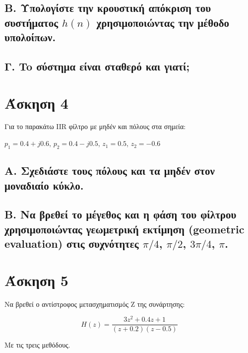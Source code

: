 \documentclass[12pt]{turabian-researchpaper}
\begin{document}
\subsection{Β. Υπολογίστε την κρουστική απόκριση του συστήματος \texorpdfstring{$h(n)$}{} χρησιμοποιώντας  την μέθοδο υπολοίπων.}
\subsection{Γ. To σύστημα είναι σταθερό και γιατί;}

\newpage\section{Άσκηση 4}

Για το παρακάτω IIR φίλτρο με μηδέν και πόλους στα σημεία:

$p_1 = 0.4 + j0.6$, $p_2 = 0.4 - j0.5$, $z_1 = 0.5 $, $z_2 = -0.6$

\subsection{Α. Σχεδιάστε τους πόλους και τα μηδέν στον μοναδιαίο κύκλο.}
\subsection{Β. Να βρεθεί το μέγεθος και η φάση του φίλτρου χρησιμοποιώντας γεωμετρική εκτίμηση (geometric evaluation) στις συχνότητες \texorpdfstring{$π/4$}{},  \texorpdfstring{$π/2$}{}, \texorpdfstring{$3π/4$}{}, \texorpdfstring{$π$}{}.}

\newpage\section{Άσκηση 5}

Να βρεθεί ο αντίστροφος μετασχηματισμός Z της συνάρτησης:

$$ H(z) = \frac{3z^2+0.4z+1}{(z+0.2)(z-0.5)}$$

Με τις τρεις μεθόδους.
\end{document}
